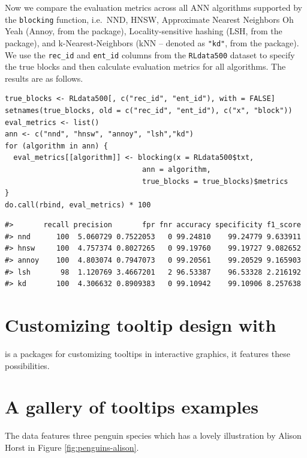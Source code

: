 Now we compare the evaluation metrics across all ANN algorithms supported by the \texttt{blocking} function, i.e.~NND, HNSW, Approximate Nearest Neighbors Oh Yeah (Annoy, from the  package), Locality-sensitive hashing (LSH, from the  package), and k-Nearest-Neighbors (kNN -- denoted as \texttt{"kd"}, from the  package). We use the \texttt{rec\_id} and \texttt{ent\_id} columns from the \texttt{RLdata500} dataset to specify the true blocks and then calculate evaluation metrics for all algorithms. The results are as follows.

\begin{verbatim}
true_blocks <- RLdata500[, c("rec_id", "ent_id"), with = FALSE]
setnames(true_blocks, old = c("rec_id", "ent_id"), c("x", "block"))
eval_metrics <- list()
ann <- c("nnd", "hnsw", "annoy", "lsh","kd")
for (algorithm in ann) {
  eval_metrics[[algorithm]] <- blocking(x = RLdata500$txt,
                                ann = algorithm,
                                true_blocks = true_blocks)$metrics
}
do.call(rbind, eval_metrics) * 100
\end{verbatim}

\begin{verbatim}
#>       recall precision       fpr fnr accuracy specificity f1_score
#> nnd      100  5.060729 0.7522053   0 99.24810    99.24779 9.633911
#> hnsw     100  4.757374 0.8027265   0 99.19760    99.19727 9.082652
#> annoy    100  4.803074 0.7947073   0 99.20561    99.20529 9.165903
#> lsh       98  1.120769 3.4667201   2 96.53387    96.53328 2.216192
#> kd       100  4.306632 0.8909383   0 99.10942    99.10906 8.257638
\end{verbatim}

\section{\texorpdfstring{Customizing tooltip design with }{Customizing tooltip design with }}\label{customizing-tooltip-design-with}

 is a packages for customizing tooltips in interactive graphics, it features these possibilities.

\section{A gallery of tooltips examples}\label{a-gallery-of-tooltips-examples}

The  data \citep{palmerpenguins} features three penguin species which has a lovely illustration by Alison Horst in Figure \ref{fig:penguins-alison}.

